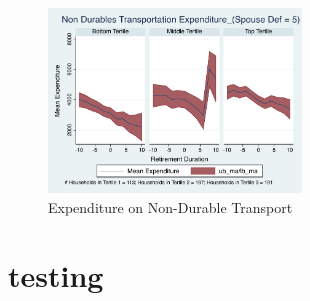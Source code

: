 \documentclass[11pt]{article}
\begin{document}
\begin{figure}[h]
	\caption{Expenditure on Non-Durable Transport}
	\centering
	\includegraphics[width=0.6\textwidth]{../ConsumptionPostRetirement_by_SpouseDef_Cats/Smoothed/5/spouse_def_total_transport_real.pdf}
\end{figure}
\clearpage

\section{testing}


\end{document}
